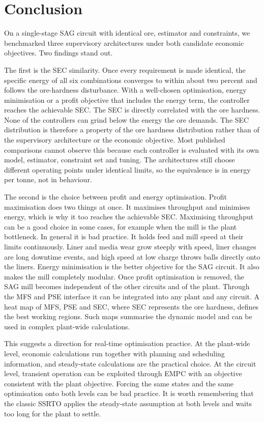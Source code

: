 \documentclass[conference]{IEEEtran}
\begin{document}
\section{Conclusion}

On a single-stage SAG circuit with identical ore, estimator and
constraints, we benchmarked three supervisory architectures under both
candidate economic objectives. Two findings stand out.

The first is the SEC similarity. Once every requirement is made
identical, the specific energy of all six combinations converges to
within about two percent and follows the ore-hardness disturbance. With
a well-chosen optimisation, energy minimisation or a profit objective
that includes the energy term, the controller reaches the achievable
SEC. The SEC is directly correlated with the ore hardness.
None of the controllers can grind below the energy the ore demands. The
SEC distribution is therefore a property of the ore hardness
distribution rather than of the supervisory architecture or the
economic objective. Most published comparisons cannot observe this
because each controller is evaluated with its own model, estimator,
constraint set and tuning. The architectures still choose different
operating points under identical limits, so the equivalence is in energy
per tonne, not in behaviour.

The second is the choice between profit and energy optimisation. Profit
maximisation does two things at once. It maximises throughput and
minimises energy, which is why it too reaches the achievable SEC.
Maximising throughput can be a good choice in some cases, for example
when the mill is the plant bottleneck. In general it is bad practice. It
holds feed and mill speed at their limits continuously. Liner and media
wear grow steeply with speed, liner changes are long downtime events,
and high speed at low charge throws balls directly onto the liners.
Energy minimisation is the better objective for the SAG circuit. It also
makes the mill completely modular. Once profit optimisation is removed,
the SAG mill becomes independent of the other circuits and of the plant.
Through the MFS and PSE interface it can be integrated into any plant
and any circuit. A heat map of MFS, PSE and SEC, where SEC represents
the ore hardness, defines the best working regions. Such maps summarise
the dynamic model and can be used in complex plant-wide calculations.

This suggests a direction for real-time optimisation practice. At the
plant-wide level, economic calculations run together with planning and
scheduling information, and steady-state calculations are the practical
choice. At the circuit level, transient operation can be exploited
through EMPC with an objective consistent with the plant objective.
Forcing the same states and the same optimisation onto both levels can
be bad practice. It is worth remembering that the classic SSRTO applies
the steady-state assumption at both levels and waits too long for the
plant to settle.
\end{document}
